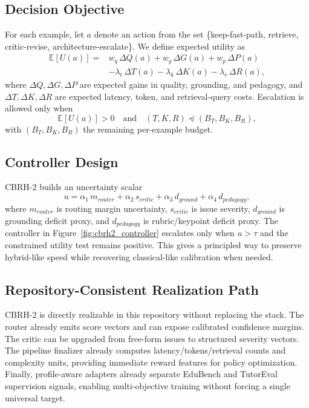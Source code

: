 \subsection{Decision Objective}
For each example, let $a$ denote an action from the set \{keep-fast-path, retrieve, critic-revise, architecture-escalate\}. We define expected utility as
\begin{equation}
\begin{aligned}
\mathbb{E}[U(a)] ={}& w_q\,\Delta Q(a) + w_g\,\Delta G(a) + w_p\,\Delta P(a) \\
&- \lambda_t\,\Delta T(a) - \lambda_k\,\Delta K(a) - \lambda_r\,\Delta R(a),
\end{aligned}
\end{equation}
where $\Delta Q,\Delta G,\Delta P$ are expected gains in quality, grounding, and pedagogy, and $\Delta T,\Delta K,\Delta R$ are expected latency, token, and retrieval-query costs. Escalation is allowed only when
\begin{equation}
\mathbb{E}[U(a)] > 0
\quad\text{and}\quad
(T,K,R) \preceq (B_T,B_K,B_R),
\end{equation}
with $(B_T,B_K,B_R)$ the remaining per-example budget.

\subsection{Controller Design}
CBRH-2 builds an uncertainty scalar
\begin{equation}
u = \alpha_1\,m_{router} + \alpha_2\,s_{critic} + \alpha_3\,d_{ground} + \alpha_4\,d_{pedagogy},
\end{equation}
where $m_{router}$ is routing margin uncertainty, $s_{critic}$ is issue severity, $d_{ground}$ is grounding deficit proxy, and $d_{pedagogy}$ is rubric/keypoint deficit proxy. The controller in Figure~\ref{fig:cbrh2_controller} escalates only when $u>\tau$ and the constrained utility test remains positive. This gives a principled way to preserve hybrid-like speed while recovering classical-like calibration when needed.

\subsection{Repository-Consistent Realization Path}
CBRH-2 is directly realizable in this repository without replacing the stack. The router already emits score vectors and can expose calibrated confidence margins. The critic can be upgraded from free-form issues to structured severity vectors. The pipeline finalizer already computes latency/tokens/retrieval counts and complexity units, providing immediate reward features for policy optimization. Finally, profile-aware adapters already separate EduBench and TutorEval supervision signals, enabling multi-objective training without forcing a single universal target.

